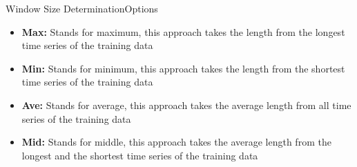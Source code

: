 \begin{frame}{Window Size Determination}{Options}
    \begin{itemize}
        \item \textbf{Max:} Stands for maximum, this approach takes the length from the longest time series of the training
            data
        
        \item \textbf{Min:} Stands for minimum, this approach takes the length from the shortest time series of the training
            data
        
        \item \textbf{Ave:} Stands for average, this approach takes the average length from all time series of the training
            data
        
        \item \textbf{Mid:} Stands for middle, this approach takes the average length from the longest and the shortest time
            series of the training data
    \end{itemize}
\end{frame}
